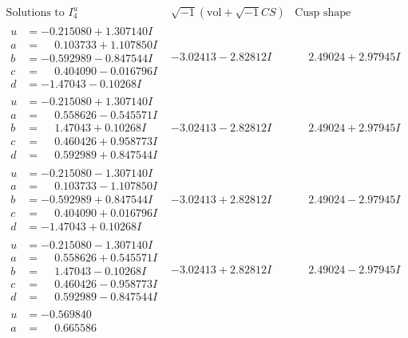 \documentclass[1p]{elsarticle_modified}
\theoremstyle{definition}
\newcommand{\I}{\sqrt{-1}}
\begin{document}
$$\begin{array}{c|c|c}  
\text{Solutions to }I^u_{4}& \I (\text{vol} + \sqrt{-1}CS) & \text{Cusp shape}\\
 \hline 
\begin{aligned}
u &= -0.215080 + 1.307140 I \\
a &= \phantom{-}0.103733 + 1.107850 I \\
b &= -0.592989 - 0.847544 I \\
c &= \phantom{-}0.404090 - 0.016796 I \\
d &= -1.47043 - 0.10268 I\end{aligned}
 & -3.02413 - 2.82812 I & \phantom{-}2.49024 + 2.97945 I \\ \hline\begin{aligned}
u &= -0.215080 + 1.307140 I \\
a &= \phantom{-}0.558626 - 0.545571 I \\
b &= \phantom{-}1.47043 + 0.10268 I \\
c &= \phantom{-}0.460426 + 0.958773 I \\
d &= \phantom{-}0.592989 + 0.847544 I\end{aligned}
 & -3.02413 - 2.82812 I & \phantom{-}2.49024 + 2.97945 I \\ \hline\begin{aligned}
u &= -0.215080 - 1.307140 I \\
a &= \phantom{-}0.103733 - 1.107850 I \\
b &= -0.592989 + 0.847544 I \\
c &= \phantom{-}0.404090 + 0.016796 I \\
d &= -1.47043 + 0.10268 I\end{aligned}
 & -3.02413 + 2.82812 I & \phantom{-}2.49024 - 2.97945 I \\ \hline\begin{aligned}
u &= -0.215080 - 1.307140 I \\
a &= \phantom{-}0.558626 + 0.545571 I \\
b &= \phantom{-}1.47043 - 0.10268 I \\
c &= \phantom{-}0.460426 - 0.958773 I \\
d &= \phantom{-}0.592989 - 0.847544 I\end{aligned}
 & -3.02413 + 2.82812 I & \phantom{-}2.49024 - 2.97945 I \\ \hline\begin{aligned}
u &= -0.569840\phantom{ +0.000000I} \\
a &= \phantom{-}0.665586\phantom{ +0.000000I} \\

\end{aligned}
\end{array}$$
\end{document}
